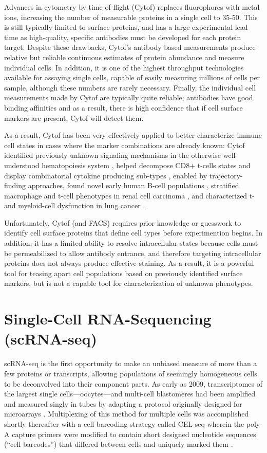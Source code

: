 Advances in cytometry by time-of-flight (Cytof) replaces fluorophores with metal ions, increasing the number of measurable proteins in a single cell to 35-50. 
This is still typically limited to surface proteins, and has a large experimental lead time as high-quality, specific antibodies must be developed for each protein target.  
Despite these drawbacks, Cytof’s antibody based measurements produce relative but reliable continuous estimates of protein abundance and measure individual cells. 
In addition, it is one of the highest throughput technologies available for assaying single cells, capable of easily measuring millions of cells per sample, although these numbers are rarely necessary. 
Finally, the individual cell measurements made by Cytof are typically quite reliable; antibodies have good binding affinities and as a result, there is high confidence that if cell surface markers are present, Cytof will detect them. 

As a result, Cytof has been very effectively applied to better characterize immune cell states in cases where the marker combinations are already known: 
Cytof identified previously unknown signaling mechanisms in the otherwise well-understood hematopoiesis system \citep{Bendall2011}, helped decompose CD8+ t-cells states and display combinatorial cytokine producing sub-types \citep{Newell2012}, enabled by trajectory-finding approaches, found novel early human B-cell populations \citep{Bendall2014}, stratified macrophage and t-cell phenotypes in renal cell carcinoma \citep{Chevrier2017}, and characterized t- and myeloid-cell dysfunction in lung cancer \citep{Lavin2017}.

Unfortunately, Cytof (and FACS) requires prior knowledge or guesswork to identify cell surface proteins that define cell types before experimention begins. 
In addition, it has a limited ability to resolve intracellular states because cells must be permeabilized to allow antibody entrance, and therefore targeting intracellular proteins does not always produce effective staining. 
As a result, it is a powerful tool for teasing apart cell populations based on previously identified surface markers, but is not a capable tool for characterization of unknown phenotypes.

\section{Single-Cell RNA-Sequencing (scRNA-seq)}

scRNA-seq is the first opportunity to make an unbiased measure of more than a few proteins or transcripts, allowing populations of seemingly homogeneous cells to be deconvolved into their component parts. 
As early as 2009, transcriptomes of the largest single cells---oocytes---and multi-cell blastomeres had been amplified and measured singly in tubes by adapting a protocol originally designed for microarrays \citep{Tang2009}. 
Multiplexing of this method for multiple cells was accomplished shortly thereafter with a cell barcoding strategy called CEL-seq wherein the poly-A capture primers were modified to contain short designed nucleotide sequences (``cell barcodes'') that differed between cells and uniquely marked them \citep{Islam2011}. 

